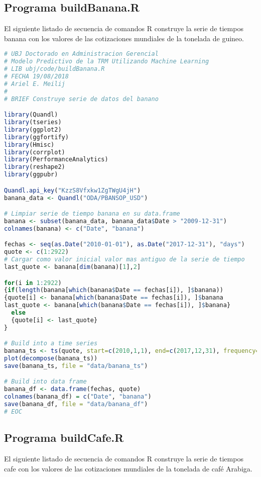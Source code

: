 \subsection{Programa buildBanana.R}
El siguiente listado de secuencia de comandos R construye la serie de tiempos banana con los valores de las cotizaciones mundiales de la tonelada de guineo.

\begin{lstlisting}[language=R]
# UBJ Doctorado en Administracion Gerencial
# Modelo Predictivo de la TRM Utilizando Machine Learning
# LIB ubj/code/buildBanana.R
# FECHA 19/08/2018
# Ariel E. Meilij
#
# BRIEF Construye serie de datos del banano

library(Quandl)
library(tseries)
library(ggplot2)
library(ggfortify)
library(Hmisc)
library(corrplot)
library(PerformanceAnalytics)
library(reshape2)
library(ggpubr)

Quandl.api_key("KzzS8Vfxkw1ZgTWgU4jH")
banana_data <- Quandl("ODA/PBANSOP_USD")

# Limpiar serie de tiempo banana en su data.frame
banana <- subset(banana_data, banana_data$Date > "2009-12-31")
colnames(banana) <- c("Date", "banana")

fechas <- seq(as.Date("2010-01-01"), as.Date("2017-12-31"), "days")
quote <- c(1:2922)
# Cargar como valor inicial valor mas antiguo de la serie de tiempo
last_quote <- banana[dim(banana)[1],2]

for(i in 1:2922)
{if(length(banana[which(banana$Date == fechas[i]), ]$banana))
{quote[i] <- banana[which(banana$Date == fechas[i]), ]$banana
last_quote <- banana[which(banana$Date == fechas[i]), ]$banana}
  else
  {quote[i] <- last_quote}
}

# Build into a time series
banana_ts <- ts(quote, start=c(2010,1,1), end=c(2017,12,31), frequency=365)
plot(decompose(banana_ts))
save(banana_ts, file = "data/banana_ts")

# Build into data frame
banana_df <- data.frame(fechas, quote)
colnames(banana_df) = c("Date", "banana")
save(banana_df, file = "data/banana_df")
# EOC
\end{lstlisting}

\subsection{Programa buildCafe.R}
El siguiente listado de secuencia de comandos R construye la serie de tiempos cafe con los valores de las cotizaciones mundiales de la tonelada de café Arabiga.

